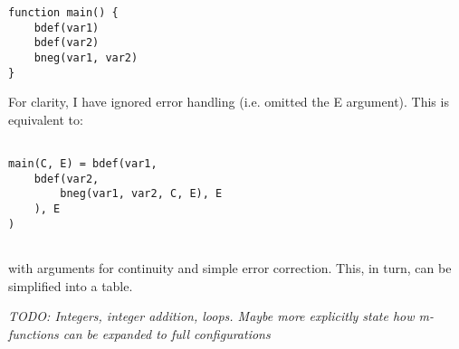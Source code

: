 \documentclass[Master.tex]{subfiles}
\begin{document}
\begin{lstlisting}
function main() {
	bdef(var1)
	bdef(var2)
	bneg(var1, var2)
}
\end{lstlisting}
For clarity, I have ignored error handling (i.e. omitted the E argument). This is equivalent to:

\begin{lstlisting}

main(C, E) = bdef(var1,
    bdef(var2,
        bneg(var1, var2, C, E), E
    ), E
)


\end{lstlisting}
with arguments for continuity and simple error correction. This, in turn, can be simplified into a table.


\textit{TODO: Integers, integer addition, loops. Maybe more explicitly state how m-functions can be expanded to full configurations}
\end{document}
